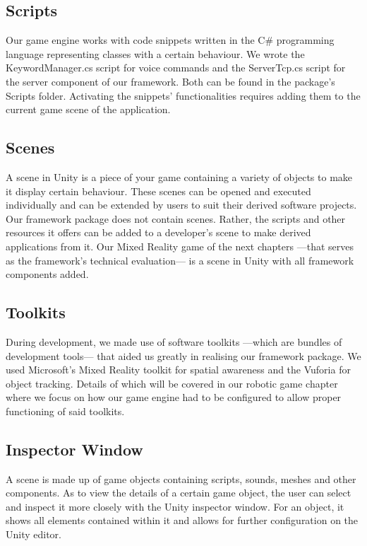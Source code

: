 \subsection{Scripts}
Our game engine works with code snippets written in the C\# programming language representing classes with a certain behaviour. We wrote the KeywordManager.cs script for voice commands and the ServerTcp.cs script for the server component of our framework. Both can be found in the package's Scripts folder. Activating the snippets' functionalities requires adding them to the current game scene of the application.

\subsection{Scenes}
A scene in Unity is a piece of your game containing a variety of objects to make it display certain behaviour. These scenes can be opened and executed individually and can be extended by users to suit their derived software projects. Our framework package does not contain scenes. Rather, the scripts and other resources it offers can be added to a developer's scene to make derived applications from it. Our Mixed Reality game of the next chapters ---that serves as the framework's technical evaluation--- is a scene in Unity with all framework components added.

\subsection{Toolkits}
During development, we made use of software toolkits ---which are bundles of development tools--- that aided us greatly in realising our framework package. We used Microsoft's Mixed Reality toolkit for spatial awareness and the Vuforia for object tracking. Details of which will be covered in our robotic game chapter where we focus on how our game engine had to be configured to allow proper functioning of said toolkits.


\subsection{Inspector Window}
A scene is made up of game objects containing scripts, sounds, meshes and other components. As to view the details of a certain game object, the user can select and inspect it more closely with the Unity inspector window. For an object, it shows all elements contained within it and allows for further configuration on the Unity editor.

